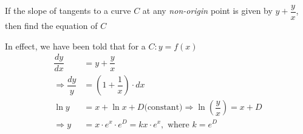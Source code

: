 


\question[3] If the slope of tangents to a curve $C$ at any \textit{non-origin} point is given 
by $y+\dfrac{y}{x}$, then find the equation of $C$


\watchout

\ifprintanswers
\fi 

\begin{solution}[\halfpage]
  In effect, we have been told that for a $C: y = f(x)$ 
  \begin{align}
    \dfrac{dy}{dx} &= y + \dfrac{y}{x} \\
    \Rightarrow \dfrac{dy}{y} &= \left(1 + \dfrac{1}{x}\right)\cdot dx \\
    \ln y &= x + \ln x + D\text{(constant)} \Rightarrow \ln\left(\dfrac{y}{x}\right) = x + D \\
    \Rightarrow y &= x\cdot e^{x}\cdot e^{D} = kx\cdot e^{x}, \text{ where } k = e^D
  \end{align}
\end{solution}

\ifprintrubric
\fi
